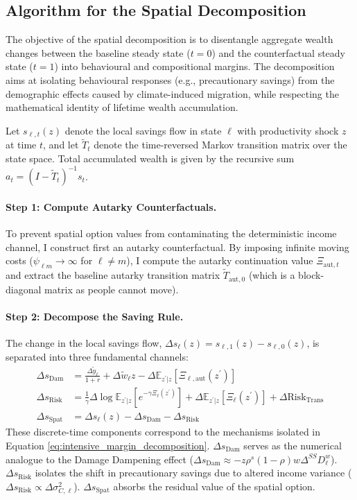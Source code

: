 \documentclass[12pt, a4paper]{article}
\begin{document}
\subsection{Algorithm for the Spatial Decomposition}
\label{sec:algorithm_spatial_decomp}

The objective of the spatial decomposition is to disentangle aggregate wealth changes between the baseline steady state ($t=0$) and the counterfactual steady state ($t=1$) into behavioural and compositional margins. The decomposition aims at isolating behavioural responses (e.g., precautionary savings) from the demographic effects caused by climate-induced migration, while respecting the mathematical identity of lifetime wealth accumulation. 

Let $s_{\ell,t}(z)$ denote the local savings flow in state $\ell$ with productivity shock $z$ at time $t$, and let $\tilde{T}_t$ denote the time-reversed Markov transition matrix over the state space. Total accumulated wealth is given by the recursive sum $a_t = (I - \tilde{T}_t)^{-1} s_t$.

\paragraph{Step 1: Compute Autarky Counterfactuals.} 
To prevent spatial option values from contaminating the deterministic income channel, I construct first an autarky counterfactual. By imposing infinite moving costs ($\psi_{\ell m} \to \infty$ for $\ell \neq m$), I compute the autarky continuation value $\Xi_{\text{aut}, t}$ and extract the baseline autarky transition matrix $\tilde{T}_{\text{aut}, 0}$ (which is a block-diagonal matrix as people cannot move).

\paragraph{Step 2: Decompose the Saving Rule.}
The change in the local savings flow, $\Delta s_{\ell}(z) = s_{\ell,1}(z) - s_{\ell,0}(z)$, is separated into three fundamental channels:
\begin{align}
    \Delta s_{\text{Dam}} &= \frac{\Delta \tilde{y}_\ell}{1+r} + \Delta \tilde{w}_\ell z - \Delta \mathbb{E}_{z^\prime|z}[\Xi_{\ell,\text{aut}}(z^\prime)] \\
    \Delta s_{\text{Risk}} &= \frac{1}{\gamma} \Delta \log \mathbb{E}_{z^\prime|z}[e^{-\gamma \Xi_{\ell}(z^\prime)}] + \Delta \mathbb{E}_{z^\prime|z}[\Xi_{\ell}(z^\prime)] + \Delta \text{Risk}_{\text{Trans}} \\
    \Delta s_{\text{Spat}} &= \Delta s_{\ell}(z) - \Delta s_{\text{Dam}} - \Delta s_{\text{Risk}}
\end{align}
These discrete-time components correspond to the mechanisms isolated in Equation \eqref{eq:intensive_margin_decomposition}. $\Delta s_{\text{Dam}}$ serves as the numerical analogue to the Damage Dampening effect ($\Delta s_{\text{Dam}} \approx - z \rho^s (1-\rho) w \Delta^{SS} D^w_\ell$). $\Delta s_{\text{Risk}}$ isolates the shift in precautionary savings due to altered income variance ($\Delta s_{\text{Risk}} \propto \Delta \sigma_{C, \ell}^2$). $\Delta s_{\text{Spat}}$ absorbs the residual value of the spatial option.
\end{document}
